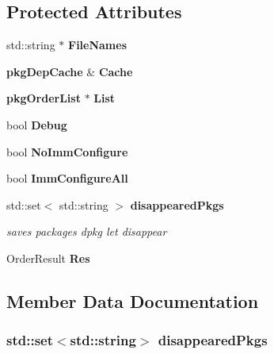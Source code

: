 \subsection*{\-Protected \-Attributes}
\begin{DoxyCompactItemize}
\item 
std\-::string $\ast$ {\bfseries \-File\-Names}\label{classpkgPackageManager_a2e3b76ddbb27ab16121bb4259f4916af}

\item 
{\bf pkg\-Dep\-Cache} \& {\bfseries \-Cache}\label{classpkgPackageManager_a55d171db69665a0bfc7ae2c2c5eef967}

\item 
{\bf pkg\-Order\-List} $\ast$ {\bfseries \-List}\label{classpkgPackageManager_aa655c64fdc23f90fafb59121d662ea88}

\item 
bool {\bfseries \-Debug}\label{classpkgPackageManager_acdf3472c9b75f32dae88032d42d1cb6c}

\item 
bool {\bfseries \-No\-Imm\-Configure}\label{classpkgPackageManager_ad05503babf375999f515474c3e6d9365}

\item 
bool {\bfseries \-Imm\-Configure\-All}\label{classpkgPackageManager_a40cf75f502ac28c21b8ca3b08ee85c2f}

\item 
std\-::set$<$ std\-::string $>$ {\bf disappeared\-Pkgs}
\begin{DoxyCompactList}\small\item\em saves packages dpkg let disappear \end{DoxyCompactList}\item 
\-Order\-Result {\bfseries \-Res}\label{classpkgPackageManager_a642c883d64a4ba0b1bd41c57f83327d6}

\end{DoxyCompactItemize}


\subsection{\-Member \-Data \-Documentation}
\subsubsection[{disappeared\-Pkgs}]{\setlength{\rightskip}{0pt plus 5cm}std\-::set$<$std\-::string$>$ {\bf disappeared\-Pkgs}\hspace{0.3cm}{\ttfamily  [protected]}}\label{classpkgPackageManager_a10c389774ccbe4ea62ec25fa13b4cf80}


